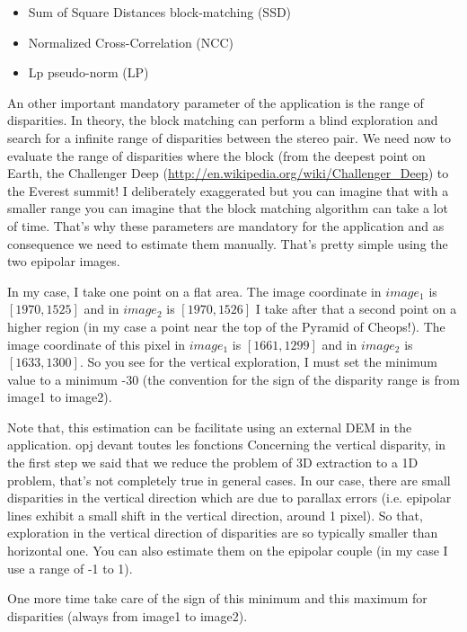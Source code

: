 \begin{itemize}
\item Sum of Square Distances block-matching (SSD)
\item Normalized Cross-Correlation (NCC)
\item Lp pseudo-norm (LP)
\end{itemize}

An other important mandatory parameter of the application is the range of
disparities. In theory, the block matching can perform a blind exploration and
search for a infinite range of disparities between the stereo pair. We need now
to evaluate the range of disparities where the block (from the deepest point on
Earth, the Challenger Deep (\url{http://en.wikipedia.org/wiki/Challenger_Deep})
to the Everest summit!  I deliberately exaggerated but you can imagine that with
a smaller range you can imagine that the block matching algorithm can take a lot
of time.  That's why these parameters are mandatory for the application and as
consequence we need to estimate them manually. That's pretty simple using the
two epipolar images.

In my case, I take one point on a flat area. The image coordinate in $image_{1}$
is $[1970,1525]$ and in $image_{2}$ is $[1970,1526]$ I take after that a second
point on a higher region (in my case a point near the top of the Pyramid of
Cheops!). The image coordinate of this pixel in $image_{1}$ is $[1661,1299]$ and
in $image_{2}$ is $[1633,1300]$.  So you see for the vertical exploration, I
must set the minimum value to a minimum -30 (the convention for the sign of the
disparity range is from image1 to image2).

Note that, this estimation can be facilitate using an external DEM in the
 application.  opj devant toutes
les fonctions Concerning the vertical disparity, in the first step we said that
we reduce the problem of 3D extraction to a 1D problem, that's not completely
true in general cases. In our case, there are small disparities in the vertical
direction which are due to parallax errors (i.e. epipolar lines exhibit a small
shift in the vertical direction, around 1 pixel). So that, exploration in the
vertical direction of disparities are so typically smaller than horizontal
one. You can also estimate them on the epipolar couple (in my case I use a range
of -1 to 1).

One more time take care of the sign of this minimum and this maximum for
disparities (always from image1 to image2).

